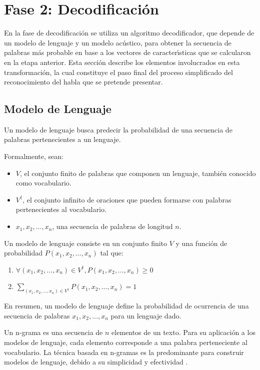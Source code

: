 \section{Fase 2: Decodificaci\'on}
\label{sec:decoding}

En la fase de decodificaci\'on se utiliza un algoritmo decodificador, que depende de 
un modelo de lenguaje y un modelo ac\'ustico, para obtener la secuencia de palabras m\'as probable
en base a los vectores de caracter{\'\i}sticas que se calcularon en la etapa anterior. 
Esta secci\'on describe los elementos involucrados en esta transformaci\'on, la cual constituye el paso
final del proceso simplificado del reconocimiento del habla que se pretende presentar.

\subsection{Modelo de Lenguaje}
Un modelo de lenguaje busca predecir la probabilidad de una secuencia de palabras pertenecientes a un lenguaje.

Formalmente, sean:
\begin{itemize}
	\item $V$, el conjunto finito de palabras que componen un lenguaje, tambi\'en conocido como vocabulario.
	\item $V^\dag$, el conjunto infinito de oraciones que pueden formarse con palabras pertenecientes 
		al vocabulario.
	\item $x_1,x_2,\ldots,x_n$, una secuencia de palabras de longitud $n$.
\end{itemize}

Un modelo de lenguaje \cite{CollinsLanguage} consiste en un conjunto finito $V$ y una funci\'on 
de probabilidad $P(x_1,x_2,\ldots,x_n)$ tal que:
\begin{enumerate}

\item $\forall (x_1,x_2,\ldots,x_n) \in V^\dag, P(x_1,x_2,\ldots,x_n) \ge 0$

\item $\displaystyle \sum_{(x_1,x_2,\ldots,x_n) \in V^\dag} P(x_1,x_2,\ldots,x_n) = 1$
\end{enumerate}


En resumen, un modelo de lenguaje define la probabilidad de ocurrencia de una secuencia de palabras
$x_1,x_2,\ldots,x_n$ para un lenguaje dado.

Un n-grama es una secuencia de $n$ elementos de un texto\cite{Tandon210}. Para su aplicaci\'on a los modelos de
lenguaje, cada elemento corresponde a una palabra perteneciente al vocabulario. La t\'ecnica basada
en n-gramas es la predominante para construir modelos de lenguaje, debido a su simplicidad y 
efectividad \cite{GaoComparative2010}.

